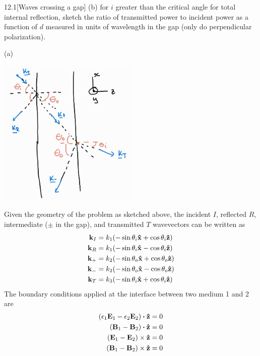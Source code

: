 \documentclass[12pt]{article}
\begin{document}
\begin{problem}{12.1}[Waves crossing a gap]
(b) for $i$ greater than the critical angle for total internal reflection,
sketch the ratio of transmitted power to incident power as a function of $d$
measured in units of wavelength in the gap (only do perpendicular polarization).
\begin{solution}
(a)
\begin{center}
    \includegraphics[width=0.5\textwidth]{hw12_p1.jpg} 
\end{center}
Given the geometry of the problem as sketched above, the incident
$I$, reflected $R$, intermediate ($\pm$ in the gap), and transmitted
$T$ wavevectors can be written as
\begin{subequations}
    \begin{align}
        \vb{k}_I&=k_1\qty(-\sin\theta_i\vb{\hat{x}}+\cos\theta_i\vb{\hat{z}})\\
        \vb{k}_R&=k_1\qty(-\sin\theta_i\vb{\hat{x}}-\cos\theta_i\vb{\hat{z}})\\
        \vb{k}_+&=k_2\qty(-\sin\theta_o\vb{\hat{x}}+\cos\theta_o\vb{\hat{z}})\\
        \vb{k}_-&=k_2\qty(-\sin\theta_o\vb{\hat{x}}-\cos\theta_o\vb{\hat{z}}) \\
        \vb{k}_T&=k_3\qty(-\sin\theta_i\vb{\hat{x}}+\cos\theta_i\vb{\hat{z}})\\
    \end{align} 
\end{subequations}
The boundary conditions applied at the interface between two medium 1 and 2 are
\begin{subequations}
    \begin{align}
        \qty(\epsilon_1\vb{E}_1-\epsilon_2\vb{E}_2)\vdot\zhat&=0\label{p1a:I}\\
        \qty(\vb{B}_1-\vb{B}_2)\vdot\zhat&=0\label{p1a:II}\\
        \qty(\vb{E}_1-\vb{E}_2)\times\zhat&=0\label{p1a:III}\\
        \qty(\vb{B}_1-\vb{B}_2)\times\zhat&=0\label{p1a:IV}
    \end{align} 
\end{subequations}


\end{solution}
\end{problem}
\end{document}

